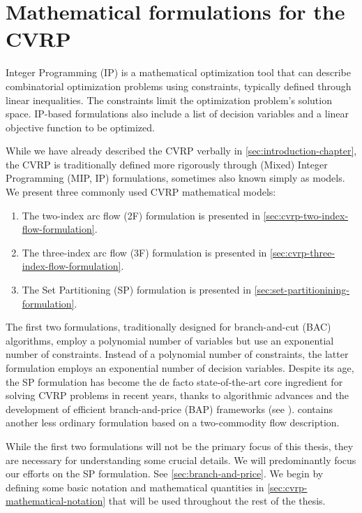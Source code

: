\chapter{Mathematical formulations for the CVRP}
\label{sec:cvrp-mathematical-formulations}

Integer Programming (IP) is a mathematical optimization tool
that can describe combinatorial optimization problems
using constraints, typically defined through linear inequalities.
The constraints limit the optimization problem's solution space.
IP-based formulations also include a list of decision variables
and a linear objective function to be optimized.

\medskip

While we have already described the CVRP verbally in \cref{sec:introduction-chapter},
the CVRP is traditionally defined more rigorously through
(Mixed) Integer Programming (MIP, IP) formulations,
sometimes also known simply as models.
We present three commonly used CVRP mathematical models:
\begin{enumerate}
	\setlength{\itemsep}{0pt}
	\setlength{\parskip}{0pt}

	\item The two-index arc flow (2F) formulation \parencite{laporte1983, laporte1985, laporte1986}
	      is presented in \cref{sec:cvrp-two-index-flow-formulation}.
	\item The three-index arc flow (3F) formulation \parencite{golden1977}
	      is presented in \cref{sec:cvrp-three-index-flow-formulation}.
	\item The Set Partitioning (SP) formulation \parencite{balinski1964}
	      is presented in \cref{sec:set-partitionining-formulation}.
\end{enumerate}

The first two formulations, traditionally designed
for branch-and-cut (BAC) algorithms, employ a polynomial number of variables
but use an exponential number of constraints.
Instead of a polynomial number of constraints,
the latter formulation employs an exponential number of decision variables.
Despite its age, the SP formulation has become the de facto state-of-the-art core ingredient
for solving CVRP problems in recent years,
thanks to algorithmic advances and the development of efficient branch-and-price (BAP) frameworks
(see \cite{pessoa2020}).
\Textcite{baldacci2004} contains another less ordinary formulation
based on a two-commodity flow description.

While the first two formulations will not be the primary focus of this thesis,
they are necessary for understanding some crucial details.
We will predominantly focus our efforts
on the SP formulation. See \cref{sec:branch-and-price}.
We begin by defining some basic notation and mathematical quantities in
\cref{sec:cvrp-mathematical-notation} that will be used throughout the rest of the thesis.

